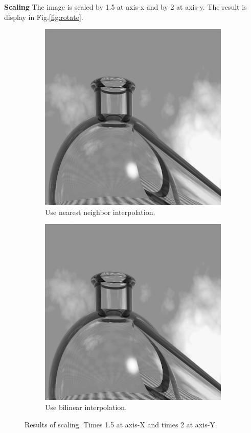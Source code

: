 \textbf{Scaling} The image is scaled by 1.5 at axis-x and by 2 at axis-y. The result is display in Fig.\ref{fig:rotate}.
\begin{figure}[h!]
	\centering
	\begin{subfigure}[b]{0.45\linewidth}
		\includegraphics[width=\linewidth]{myfigure/p6/scale_ne.png}
		\caption{Use nearest neighbor interpolation.}
		\label{fig:scale_ne}
	\end{subfigure}
  	\begin{subfigure}[b]{0.45\linewidth}
		\includegraphics[width=\linewidth]{myfigure/p6/scale_bi.png}
		\caption{Use bilinear interpolation.}
		\label{fig:scale_bi}
	\end{subfigure}
  	\caption{Results of scaling. Times 1.5 at axis-X and times 2 at axis-Y.}
  	\label{fig:scale}
\end{figure}

